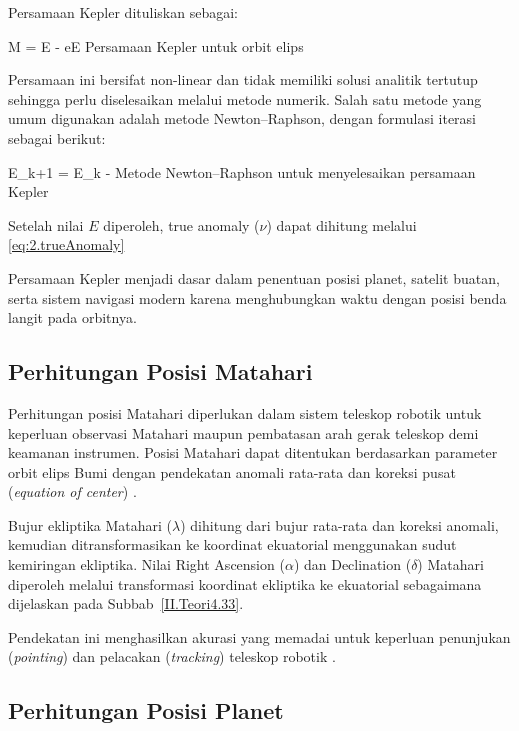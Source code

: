 Persamaan Kepler dituliskan sebagai:

\begin{equationcaptioned}[eq:2.persamaanKepler]{
		M = E - e\sin E
	}{
		Persamaan Kepler untuk orbit elips \cite{Meeus1998}
	}
\end{equationcaptioned}

Persamaan ini bersifat non-linear dan tidak memiliki solusi analitik tertutup sehingga perlu diselesaikan melalui metode numerik. Salah satu metode yang umum digunakan adalah metode Newton–Raphson, dengan formulasi iterasi sebagai berikut:

\begin{equationcaptioned}[eq:2.newtonKepler]{
		E_{k+1}
		=
		E_k
		-
	}{
		Metode Newton–Raphson untuk menyelesaikan persamaan Kepler \cite{vallado}
	}
\end{equationcaptioned}

Setelah nilai $E$ diperoleh, true anomaly ($\nu$) dapat dihitung melalui  \ref{eq:2.trueAnomaly}

Persamaan Kepler menjadi dasar dalam penentuan posisi planet, satelit buatan, serta sistem navigasi modern karena menghubungkan waktu dengan posisi benda langit pada orbitnya.

\subsection{Perhitungan Posisi Matahari} \label{II.TeoriMatahari}

Perhitungan posisi Matahari diperlukan dalam sistem teleskop robotik untuk keperluan observasi Matahari maupun pembatasan arah gerak teleskop demi keamanan instrumen. Posisi Matahari dapat ditentukan berdasarkan parameter orbit elips Bumi dengan pendekatan anomali rata-rata dan koreksi pusat (\textit{equation of center}) \cite{Meeus1998}. 

Bujur ekliptika Matahari ($\lambda$) dihitung dari bujur rata-rata dan koreksi anomali, kemudian ditransformasikan ke koordinat ekuatorial menggunakan sudut kemiringan ekliptika. Nilai Right Ascension ($\alpha$) dan Declination ($\delta$) Matahari diperoleh melalui transformasi koordinat ekliptika ke ekuatorial sebagaimana dijelaskan pada Subbab~\ref{II.Teori4.33}.

Pendekatan ini menghasilkan akurasi yang memadai untuk keperluan penunjukan (\textit{pointing}) dan pelacakan (\textit{tracking}) teleskop robotik \cite{Meeus1998}.
\subsection{Perhitungan Posisi Planet} \label{II.TeoriPlanet}

